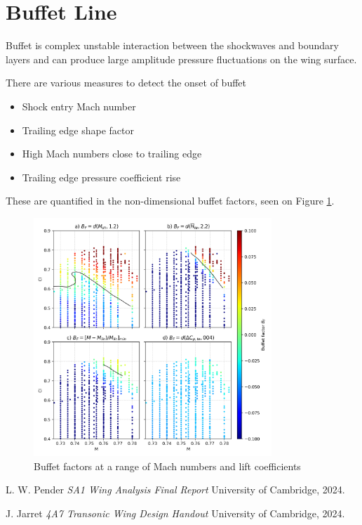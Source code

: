 \documentclass{article}
\begin{document}
\section{Buffet Line}

Buffet is complex unstable interaction between the shockwaves and boundary layers and can produce large amplitude pressure fluctuations on the wing surface.

There are various measures to detect the onset of buffet
\begin{itemize}
    \item Shock entry Mach number
    \item Trailing edge shape factor
    \item High Mach numbers close to trailing edge
    \item Trailing edge pressure coefficient rise
\end{itemize}
These are quantified in the non-dimensional buffet factors, seen on Figure \ref{fig:buffet_classification}.

\begin{figure}[H]
    \centering
    \includegraphics[width=0.8\textwidth]{figures/buffet_classification.png}
    \caption{Buffet factors at a range of Mach numbers and lift coefficients}
    \label{fig:buffet_classification}
\end{figure}

\begin{thebibliography}{9}


      L. W. Pender
      \emph{SA1 Wing Analysis Final Report}
      University of Cambridge,
      2024.
    
      J. Jarret
      \emph{4A7 Transonic Wing Design Handout}
      University of Cambridge,
      2024.
    
\end{thebibliography}
\end{document}
